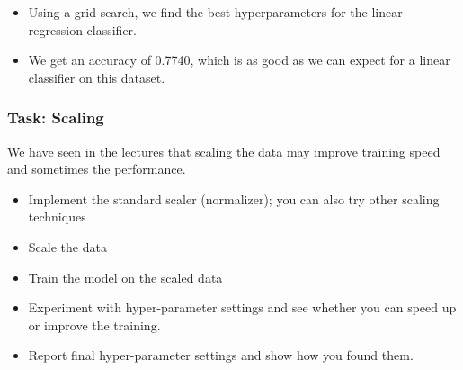 \documentclass[a4paper,landscape]{article}
\providecommand{\tightlist}{%
      \setlength{\itemsep}{0pt}\setlength{\parskip}{0pt}}
\begin{document}
\begin{itemize}
\tightlist
\item
  Using a grid search, we find the best hyperparameters for the linear
  regression classifier.
\item
  We get an accuracy of 0.7740, which is as good as we can expect for a
  linear classifier on this dataset.
\end{itemize}

    \subsubsection{Task: Scaling}\label{task-scaling}

    We have seen in the lectures that scaling the data may improve training
speed and sometimes the performance.

\begin{itemize}
\tightlist
\item
  Implement the standard scaler (normalizer); you can also try other
  scaling techniques
\item
  Scale the data
\item
  Train the model on the scaled data
\item
  Experiment with hyper-parameter settings and see whether you can speed
  up or improve the training.
\item
  Report final hyper-parameter settings and show how you found them.
\end{itemize}
\end{document}
